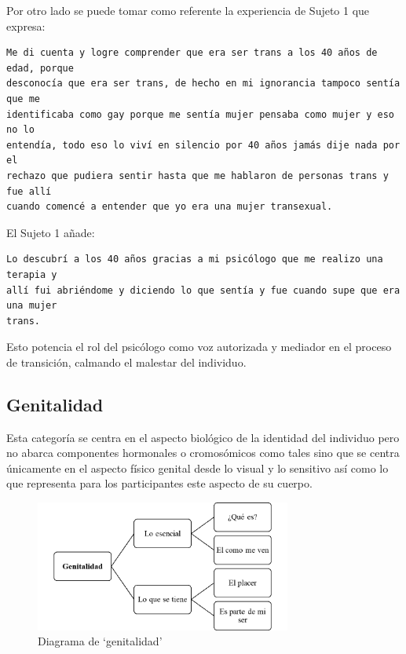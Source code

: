 Por otro lado se puede tomar como referente la experiencia de Sujeto 1 que
expresa:

\begin{verbatim}
Me di cuenta y logre comprender que era ser trans a los 40 años de edad, porque
desconocía que era ser trans, de hecho en mi ignorancia tampoco sentía que me
identificaba como gay porque me sentía mujer pensaba como mujer y eso no lo
entendía, todo eso lo viví en silencio por 40 años jamás dije nada por el
rechazo que pudiera sentir hasta que me hablaron de personas trans y fue allí
cuando comencé a entender que yo era una mujer transexual.
\end{verbatim}

El Sujeto 1 añade:

\begin{verbatim}
Lo descubrí a los 40 años gracias a mi psicólogo que me realizo una terapia y
allí fui abriéndome y diciendo lo que sentía y fue cuando supe que era una mujer
trans.
\end{verbatim}

Esto potencia el rol del psicólogo como voz autorizada y mediador en el proceso
de transición, calmando el malestar del individuo.

\subsection{Genitalidad}

Esta categoría se centra en el aspecto biológico de la identidad del individuo
pero no abarca componentes hormonales o cromosómicos como tales sino que se
centra únicamente en el aspecto físico genital desde lo visual y lo sensitivo
así como lo que representa para los participantes este aspecto de su cuerpo.

\begin{figure}
    \centering
    \includegraphics[width=0.75\textwidth]{genitalidad}
    \caption{Diagrama de ‘genitalidad’}\label{fig:genitalidad}
\end{figure}

